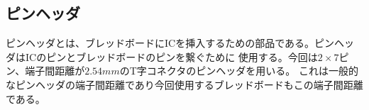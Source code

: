 \documentclass[a4paper,11pt,dvipdfmx]{jsarticle}
\begin{document}
\subsection{ピンヘッダ}
ピンヘッダとは、ブレッドボードにICを挿入するための部品である。ピンヘッダはICのピンとブレッドボードのピンを繋ぐために
使用する。今回は$2\times 7$ピン、端子間距離が$2.54mm$のT字コネクタのピンヘッダを用いる。
これは一般的なピンヘッダの端子間距離であり今回使用するブレッドボードもこの端子間距離である。


\end{document}
